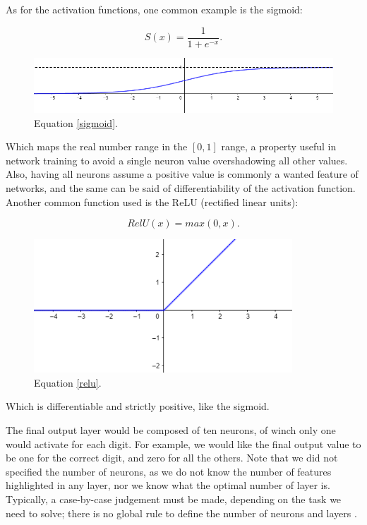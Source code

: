 \documentclass[a4paper]{report}
\begin{document}
As for the activation functions, one common example is the sigmoid:

\begin{equation}
	S(x) = \frac{1}{1+e^{-x}}.
	\label{sigmoid}
\end{equation}

\begin{figure}[H]
\centering
\includegraphics[width=\textwidth]{o/sigmoid.png}
\caption{Equation \ref{sigmoid}.}
\end{figure}
Which maps the real number range in the $[0,1]$ range, a property useful in network training to avoid a single neuron value overshadowing all other values.
Also, having all neurons assume a positive value is commonly a wanted feature of networks, and the same can be said of differentiability of the activation function.
Another common function used is the ReLU (rectified linear units):

\begin{equation}
	RelU(x) = max(0, x).
	\label{relu}
\end{equation}

\begin{figure}[H]
\centering
\includegraphics[height=5cm]{o/relu.png}
\caption{Equation \ref{relu}.}
\end{figure}

Which is differentiable and strictly positive, like the sigmoid.

The final output layer would be composed of ten neurons, of winch only one would activate for each digit.
For example, we would like the final output value to be one for the correct digit, and zero for all the others.
Note that we did not specified the number of neurons, as we do not know the number of features highlighted in any layer, nor we know what the optimal number of layer is.
Typically, a case-by-case judgement must be made, depending on the task we need to solve;
there is no global rule to define the number of neurons and layers \cite{bishop2006pattern}.
\end{document}
